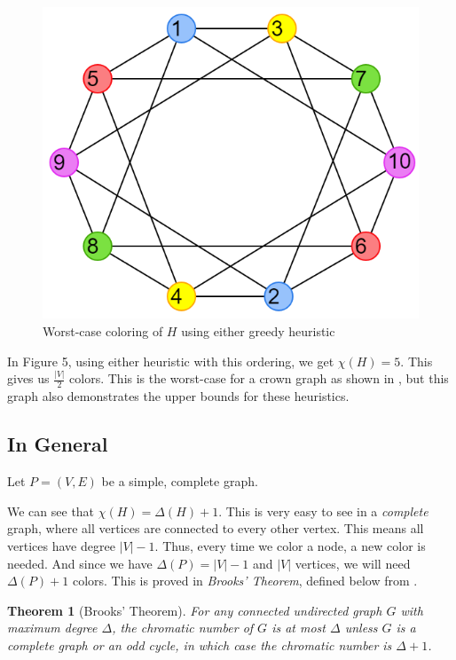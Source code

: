 \documentclass{article}
\newtheorem*{theorem}{Theorem}
\begin{document}
\begin{figure}[H]
\centering
\includegraphics[scale=0.38]{graph-5.png}
\caption{Worst-case coloring of \(H\) using either greedy heuristic}
\end{figure}

In Figure 5, using either heuristic with this ordering, we get \(\chi(H) = 5\). This gives us \(\frac{|V|}{2}\) colors. This is the worst-case for a crown graph as shown in \cite{johnson}, but this graph also demonstrates the upper bounds for these heuristics. \newline

\subsection*{In General}

Let \(P = (V, E)\) be a simple, complete graph. \newline

We can see that \(\chi(H) = \Delta(H) + 1\). This is very easy to see in a \emph{complete} graph, where all vertices are connected to every other vertex. This means all vertices have degree \(|V| - 1\). Thus, every time we color a node, a new color is needed. And since we have \(\Delta(P) = |V| - 1\) and \(|V|\) vertices, we will need \(\Delta(P) + 1\) colors. This is proved in \emph{Brooks' Theorem}, defined below from \cite{bondymurty}.

\begin{theorem}[Brooks' Theorem]
For any connected undirected graph \(G\) with maximum degree \(\Delta\), the chromatic number of \(G\) is at most \(\Delta\) unless \(G\) is a complete graph or an odd cycle, in which case the chromatic number is \(\Delta + 1\).
\end{theorem}
\end{document}
